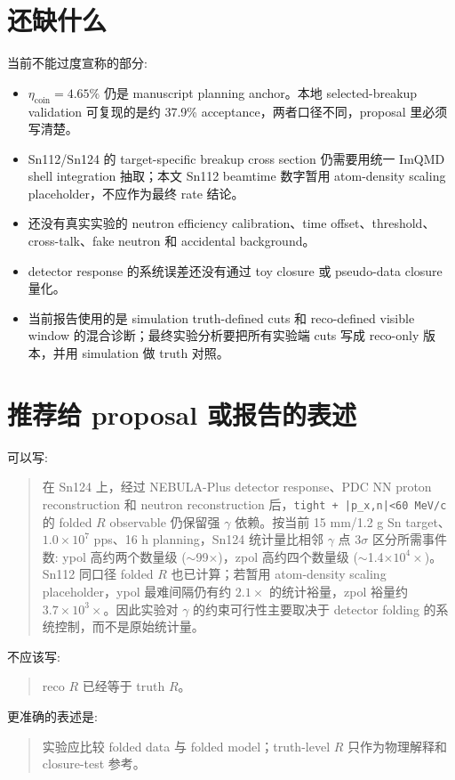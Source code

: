 \documentclass[a4paper,11pt]{article}
\begin{document}
\section{还缺什么}

当前不能过度宣称的部分:
\begin{itemize}
  \item $\eta_{\mathrm{coin}}=4.65\%$ 仍是 manuscript planning anchor。本地 selected-breakup validation 可复现的是约 37.9\% acceptance，两者口径不同，proposal 里必须写清楚。
  \item Sn112/Sn124 的 target-specific breakup cross section 仍需要用统一 ImQMD shell integration 抽取；本文 Sn112 beamtime 数字暂用 atom-density scaling placeholder，不应作为最终 rate 结论。
  \item 还没有真实实验的 neutron efficiency calibration、time offset、threshold、cross-talk、fake neutron 和 accidental background。
  \item detector response 的系统误差还没有通过 toy closure 或 pseudo-data closure 量化。
  \item 当前报告使用的是 simulation truth-defined cuts 和 reco-defined visible window 的混合诊断；最终实验分析要把所有实验端 cuts 写成 reco-only 版本，并用 simulation 做 truth 对照。
\end{itemize}

\section{推荐给 proposal 或报告的表述}

可以写:
\begin{quote}
在 Sn124 上，经过 NEBULA-Plus detector response、PDC NN proton reconstruction 和 neutron reconstruction 后，\texttt{tight + |p\_x,n|<60 MeV/c} 的 folded $R$ observable 仍保留强 $\gamma$ 依赖。按当前 15 mm/1.2 g Sn target、$1.0\times 10^7$ pps、16 h planning，Sn124 统计量比相邻 $\gamma$ 点 3$\sigma$ 区分所需事件数: ypol 高约两个数量级 ($\sim$99$\times$)，zpol 高约四个数量级 ($\sim$1.4$\times10^4\times$)。Sn112 同口径 folded $R$ 也已计算；若暂用 atom-density scaling placeholder，ypol 最难间隔仍有约 $2.1\times$ 的统计裕量，zpol 裕量约 $3.7\times10^3\times$。因此实验对 $\gamma$ 的约束可行性主要取决于 detector folding 的系统控制，而不是原始统计量。
\end{quote}

不应该写:
\begin{quote}
reco $R$ 已经等于 truth $R$。
\end{quote}

更准确的表述是:
\begin{quote}
实验应比较 folded data 与 folded model；truth-level $R$ 只作为物理解释和 closure-test 参考。
\end{quote}
\end{document}
